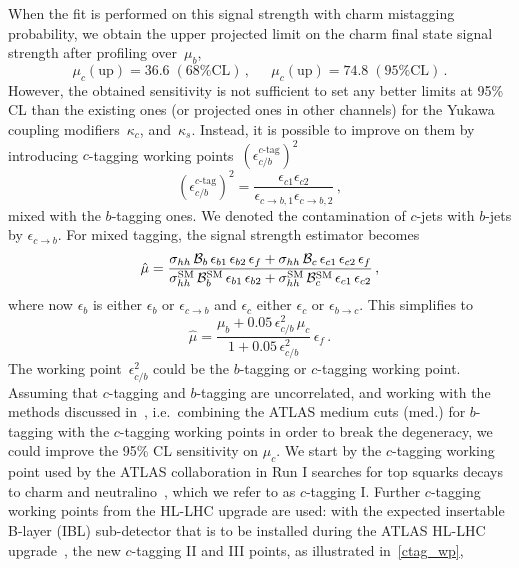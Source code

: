 When the fit is performed on this signal strength with charm mistagging probability, we obtain the upper projected limit on the charm final state signal strength after profiling over~$\mu_b$,
\begin{equation}
	\mu_c(\mathrm{up}) = 36.6 \;(\text{68\% CL})\,, \, \;\;\;\; \,  \mu_c(\mathrm{up}) = 74.8 \;(\text{95\% CL})\,.
\end{equation}
However, the obtained sensitivity is not sufficient to set any better limits at 95\% CL than the existing ones (or projected ones in other  channels) for the Yukawa coupling modifiers~$\kappa_c$, and~$\kappa_s$. Instead, it is possible to  improve on them by introducing $c$-tagging working points~$(\epsilon_{c/b}^{\text{$c$-tag}})^2$
\begin{equation}
	\left( \epsilon_{c/b}^{\text{$c$-tag}}\right)^2 = \frac{\epsilon_{c1}  \epsilon_{c2} }{\epsilon_{c \to b,1} \epsilon_{c \to b,2}}\,,
\end{equation}
mixed with the  $b$-tagging ones. We denoted  the contamination of $c$-jets with $b$-jets by $\epsilon_{c \to b}$.  For mixed tagging,  the signal strength estimator becomes
\begin{equation}
	\hat \mu = \frac{\sigma_{hh}\, \mathcal B_b \,\epsilon_{b1}\,\epsilon_{b2} \, \epsilon_f+\sigma_{hh}\, \mathcal B_c  \,\epsilon_{c1}\,\epsilon_{c2} \,\epsilon_f }{\sigma_{hh}^{\mathrm{SM}}\, \mathcal B_b^{\mathrm{SM}}\, \epsilon_{b1}\,\epsilon_{b2}
		+\sigma_{hh}^{\mathrm{SM}}\, \mathcal B_c^{\mathrm{SM}}\, \epsilon_{c1}\,\epsilon_{c2}
	} \,,
\end{equation}
where now $\epsilon_{b}$ is either $\epsilon_{b}$ or $\epsilon_{c\to b}$  and $\epsilon_{c}$ either $\epsilon_{c}$ or $\epsilon_{b\to c}$.
This simplifies to
\begin{equation}
	\hat \mu  = \frac{\mu_b+0.05\,\epsilon_{c/b}^2\,\mu_c}{1+0.05\,\epsilon_{c/b}^2}\, \epsilon_f\,.
\end{equation}
The working point~$\epsilon_{c/b}^2$ could be the $b$-tagging or $c$-tagging working point.
Assuming that $c$-tagging and $b$-tagging are uncorrelated, and working with the methods discussed in~\cite{Perez:2015aoa,Perez:2015lra}, i.e.~combining the ATLAS medium cuts (med.) for $b$-tagging with the $c$-tagging working points in order to break the degeneracy, we could improve the 95\% CL sensitivity on $\mu_c$.
We start by the $c$-tagging working point used by the ATLAS collaboration in Run I searches for top squarks decays to charm and neutralino~\cite{Aad:2015gna,ATLAS-CONF-2013-063}, which we refer to as $c$-tagging I.
Further $c$-tagging working points from the HL-LHC upgrade are used: with the expected insertable B-layer (IBL) sub-detector that is to be installed during the ATLAS HL-LHC upgrade~\cite{Capeans:1291633,ATL-PHYS-PUB-2015-018}, the new $c$-tagging II and III points, as illustrated in~\autoref{ctag_wp},
